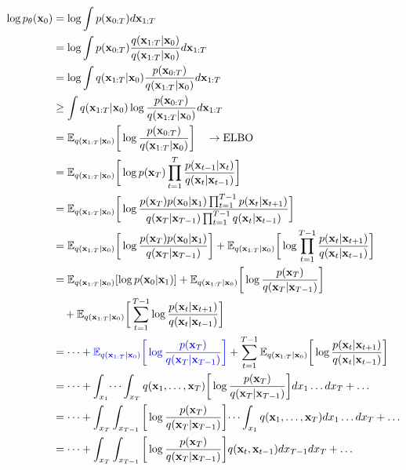 \begin{align}
\log p_\theta(\rvx_0) 
	&=  \log\int p(\rvx_{0:T})d\rvx_{1:T}\\
	&= \log\int p(\rvx_{0:T})\frac{q(\rvx_{1:T}|\rvx_0)}{q(\rvx_{1:T}|\rvx_0)}d\rvx_{1:T}\\
	&= \log\int q(\rvx_{1:T}|\rvx_0)\frac{p(\rvx_{0:T})}{q(\rvx_{1:T}|\rvx_0)}d\rvx_{1:T}\\
	&\geq \int q(\rvx_{1:T}|\rvx_0)\log\frac{p(\rvx_{0:T})}{q(\rvx_{1:T}|\rvx_0)}d\rvx_{1:T}\\
	&= \mathbb{E}_{q(\rvx_{1:T}|\rvx_0)}\bigg[\log\frac{p(\rvx_{0:T})}{q(\rvx_{1:T}|\rvx_0)}\bigg] \quad \to \textrm{ELBO}\\
	&= \mathbb{E}_{q(\rvx_{1:T}|\rvx_0)}\bigg[\log p(\rvx_T)\prod_{t=1}^T\frac{p(\rvx_{t-1}|\rvx_t)}{q(\rvx_{t}|\rvx_{t-1})}\bigg]\\
	&= \mathbb{E}_{q(\rvx_{1:T}|\rvx_0)}\bigg[\log \frac{p(\rvx_T)p(\rvx_0|\rvx_{1})\prod_{t=1}^{T-1} p(\rvx_{t}|\rvx_{t+1})}{q(\rvx_T|\rvx_{T-1})\prod_{t=1}^{T-1}  q(\rvx_{t}|\rvx_{t-1})}\bigg]\\
	&= \mathbb{E}_{q(\rvx_{1:T}|\rvx_0)}\bigg[\log \frac{p(\rvx_T)p(\rvx_0|\rvx_{1})}{q(\rvx_T|\rvx_{T-1})}\bigg] + \mathbb{E}_{q(\rvx_{1:T}|\rvx_0)}\bigg[\log \prod_{t=1}^{T-1}\frac{ p(\rvx_{t}|\rvx_{t+1})}{q(\rvx_{t}|\rvx_{t-1})}\bigg]\\
	&= \mathbb{E}_{q(\rvx_{1:T}|\rvx_0)}[\log p(\rvx_0|\rvx_{1})]+\mathbb{E}_{q(\rvx_{1:T}|\rvx_0)}\bigg[\log \frac{p(\rvx_T)}{q(\rvx_T|\rvx_{T-1})}\bigg]\\ 
	&\quad + \mathbb{E}_{q(\rvx_{1:T}|\rvx_0)}\bigg[\sum_{t=1}^{T-1}\log \frac{ p(\rvx_{t}|\rvx_{t+1})}{q(\rvx_{t}|\rvx_{t-1})}\bigg]\\
	&= \dots + \blue{\mathbb{E}_{q(\rvx_{1:T}|\rvx_0)}\bigg[\log \frac{p(\rvx_T)}{q(\rvx_T|\rvx_{T-1})}\bigg]} + \sum_{t=1}^{T-1}\mathbb{E}_{q(\rvx_{1:T}|\rvx_0)}\bigg[\log \frac{ p(\rvx_{t}|\rvx_{t+1})}{q(\rvx_{t}|\rvx_{t-1})}\bigg]\\
		&= \dots + \int_{x_1}\dots\int_{x_T}q(\rvx_{1},\dots,\rvx_{T})\bigg[\log \frac{p(\rvx_T)}{q(\rvx_T|\rvx_{T-1})}\bigg]dx_1\dots dx_T + \dots\\
		&= \dots + \int_{x_T}\int_{x_{T-1}}\bigg[\log \frac{p(\rvx_T)}{q(\rvx_T|\rvx_{T-1})}\bigg]\dots\int_{x_1} q(\rvx_{1},\dots,\rvx_{T})dx_1\dots dx_T + \dots\\
		&= \dots + \int_{x_T}\int_{x_{T-1}}\bigg[\log \frac{p(\rvx_T)}{q(\rvx_T|\rvx_{T-1})}\bigg] q(\rvx_{t},\rvx_{t-1})dx_{T-1} dx_T + \dots\\

\end{align}
